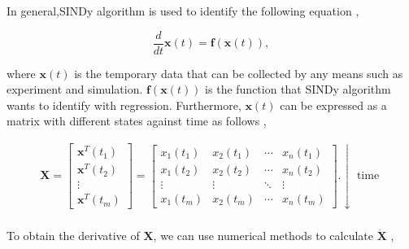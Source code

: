\documentclass[review]{elsarticle}
\begin{document}
In general,SINDy algorithm is used to identify the following equation \cite{brunton2017discovering},
\begin{linenomath}
	\begin{equation}
		\frac{d}{d t} \mathbf{x}(t)=\mathbf{f}(\mathbf{x}(t)),
	\end{equation}
\end{linenomath}
where $\mathbf{x}(t)$ is the temporary data that can be collected by any means such as experiment and simulation. $\mathbf{f}(\mathbf{x}(t))$ is the function that SINDy algorithm wants to identify with regression. Furthermore, $\mathbf{x}(t)$ can be expressed as a matrix with different states against time as follows \cite{brunton2017discovering},  
\begin{linenomath}
\begin{equation}
	\begin{gathered}
		\mathbf{X}=\left[\begin{array}{c}
			\mathbf{x}^T\left(t_1\right) \\
			\mathbf{x}^T\left(t_2\right) \\
			\vdots \\
			\mathbf{x}^T\left(t_m\right)
		\end{array}\right]=\left[\begin{array}{cccc}
			x_1\left(t_1\right) & x_2\left(t_1\right) & \cdots & x_n\left(t_1\right) \\
			x_1\left(t_2\right) & x_2\left(t_2\right) & \cdots & x_n\left(t_2\right) \\
			\vdots & \vdots & \ddots & \vdots \\
			x_1\left(t_m\right) & x_2\left(t_m\right) & \cdots & x_n\left(t_m\right)
		\end{array}\right]. \downarrow \text { time } \\
\end{gathered}
\end{equation}
\end{linenomath}
To obtain the derivative of $\mathbf{X}$, we can use numerical methods to calculate $\dot{\mathbf{X}}$ \cite{brunton2017discovering},
\end{document}
